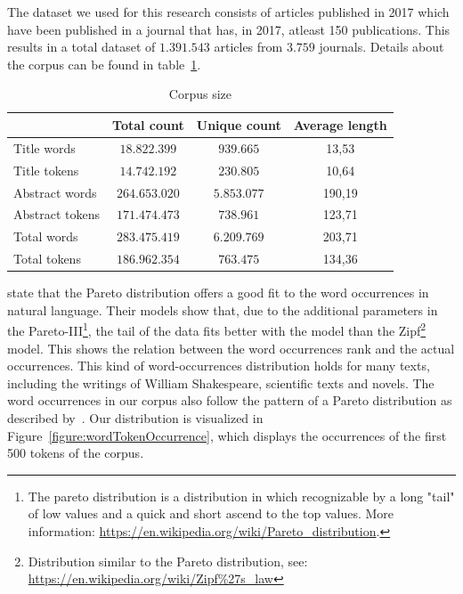 \documentclass[../../Thesis.tex]{subfiles}
\begin{document}
The dataset we used for this research consists of articles published in 2017 which have been published in a journal that has, in 2017, atleast 150 publications. This results in a total dataset of $1.391.543$ articles from $3.759$ journals. Details about the corpus can be found in table~\ref{table:corpusSize}.
\begin{table}[hbt]
\begin{center}
\begin{tabular}{|l|c|c|c|}
\hline
 & Total count & Unique count & Average length \\
\hline\hline
Title words & $18.822.399$ & $939.665$ & 13,53  \\
\hline
Title tokens & $14.742.192$ & $230.805$ & 10,64 \\
\hline\hline
Abstract words & $264.653.020$ & $5.853.077$  & 190,19  \\
\hline
Abstract tokens & $171.474.473$ & $738.961$ & 123,71 \\
\hline\hline
Total words & $283.475.419$ & $6.209.769$  & 203,71 \\
\hline
Total tokens & $186.962.354$ & $763.475$ & 134,36 \\
\hline
\end{tabular}
\end{center}
\caption{Corpus size}\label{table:corpusSize}
\end{table}
\clearpage
{}
\citet{wiegand2018word} state that the Pareto distribution offers a good fit to the word occurrences in natural language. Their models show that, due to the additional parameters in the Pareto-III\footnote{The pareto distribution is a distribution in which recognizable by a long "tail" of low values and a quick and short ascend to the top values. More information: \url{https://en.wikipedia.org/wiki/Pareto_distribution}.}, the tail of the data fits better with the model than the Zipf\footnote{Distribution similar to the Pareto distribution, see: \url{https://en.wikipedia.org/wiki/Zipf\%27s_law}} model. This shows the relation between the word occurrences rank and the actual occurrences. This kind of word-occurrences distribution holds for many texts, including the writings of William Shakespeare, scientific texts and novels\cite{thurner2015understanding}.
The word occurrences in our corpus also follow the pattern of a Pareto distribution as described by~\citet{wiegand2018word}. Our distribution is visualized in Figure~\ref{figure:wordTokenOccurrence}, which displays the occurrences of the first 500 tokens of the corpus.
\end{document}
